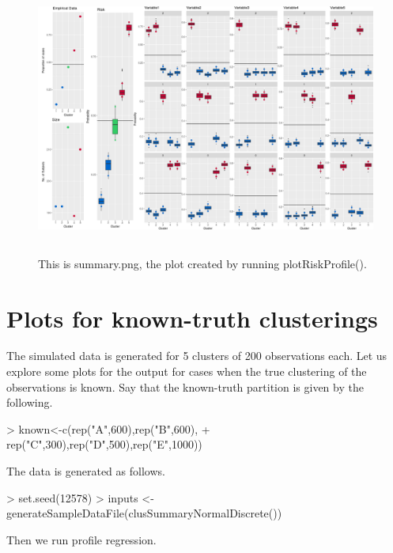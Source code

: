 \documentclass{article}
\begin{document}
\begin{figure}[ht]
\centering
\includegraphics[height=9cm]{"summary"}
\caption{This is summary.png, the plot created by running plotRiskProfile().\label{fig:summary}}
\end{figure}

\section{Plots for known-truth clusterings}
The simulated data is generated for 5 clusters of 200 observations each. Let us explore some plots for the output for cases when the true clustering of the observations is known. Say that the known-truth partition is given by the following.

\begin{Schunk}
\begin{Sinput}
> known<-c(rep("A",600),rep("B",600),
+          rep("C",300),rep("D",500),rep("E",1000))
\end{Sinput}
\end{Schunk}

The data is generated as follows. 

\begin{Schunk}
\begin{Sinput}
> set.seed(12578)
> inputs <- generateSampleDataFile(clusSummaryNormalDiscrete())
\end{Sinput}
\end{Schunk}

Then we run profile regression.
\end{document}
